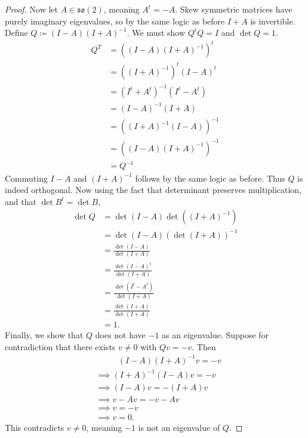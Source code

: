 \documentclass[11pt, letterpaper]{article}
\theoremstyle{plain}
\begin{document}
\begin{proof}
	Now let $A\in \mathfrak{so} (2)$, meaning $A^t=-A$. Skew symmetric matrices have purely imaginary eigenvalues, so by the same logic as before $I+A$ is invertible. Define $Q\coloneqq (I-A)(I+A)^{-1} $. We must show $Q^tQ=I$ and $\det Q=1$.
\begin{align*}
	Q^T &= \left( (I-A)(I+A)^{-1} \right)^t \\
&= ((I+A)^{-1})^t (I-A)^t \\
&= (I^t+A^t)^{-1} (I^t-A^t)\\
&=(I-A)^{-1} (I+A)\\
&=\left( (I+A)^{-1} (I-A) \right) ^{-1} \\
&=\left( (I-A)(I+A)^{-1}  \right) ^{-1} \\
&=Q^{-1} 
\end{align*}
Commuting $I-A$ and $(I+A)^{-1} $ follows by the same logic as before. Thus $Q$ is indeed orthogonal. Now using the fact that determinant preserves multiplication, and that $\det B^t=\det B$,
\begin{align*}
	\det Q &= \det \left( I-A \right) \det \left( (I+A)^{-1}  \right) \\
	       &=\det (I-A) \left( \det (I+A) \right) ^{-1} \\
	       &=\frac{\det (I-A)}{\det (I+A)} \\
	       &=\frac{\det (I-A)^t}{\det (I+A)} \\
	       &=\frac{\det (I^t-A^t)}{\det (I+A)} \\
	       &=\frac{\det (I+A)}{\det (I+A)} \\
	       &=1
.\end{align*}
Finally, we show that $Q$ does not have $-1$ as an eigenvalue. Suppose for contradiction that there exists $v\neq 0$ with $Qv=-v$. Then
\begin{align*}
	&\qquad\,\,\,\,(I-A)(I+A)^{-1} v=-v \\
	&\implies (I+A)^{-1} (I-A)v=-v\\
	&\implies (I-A)v=-(I+A)v\\
	&\implies v-Av=-v-Av\\
	&\implies v=-v\\
	&\implies v=0
.\end{align*}
This contradicts $v\neq 0$, meaning $-1$ is not an eigenvalue of $Q$.
\end{proof}

	
	
\end{document}
